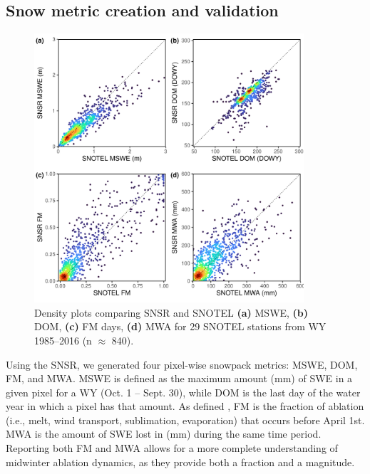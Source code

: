 
\hypertarget{ch2-methods-1}{\subsection{Snow metric creation and validation}\label{ch2-methods-1}}

\begin{figure}[t]
\centering
\includegraphics[width=10cm]{figures/ch2_figs/snsr_snotel_metric_compare_new_v1.pdf}
\caption{Density plots comparing SNSR and SNOTEL \textbf{(a)} MSWE, \textbf{(b)} DOM, \textbf{(c)} FM days, \textbf{(d)} MWA for 29 SNOTEL stations from WY 1985--2016 (n $\approx$ 840).}
\label{kuy_study_area}
\end{figure}

Using the SNSR, we generated four pixel-wise snowpack metrics: MSWE, DOM, FM, and MWA. MSWE is defined as the maximum amount (mm) of SWE in a given pixel for a WY (Oct. 1 -- Sept. 30), while DOM is the last day of the water year in which a pixel has that amount. As defined \cite{musselmanWinterMeltTrends2021}, FM is the fraction of ablation (i.e., melt, wind transport, sublimation, evaporation) that occurs before April 1st. MWA is the amount of SWE lost in (mm) during the same time period. Reporting both FM and MWA allows for a more complete understanding of midwinter ablation dynamics, as they provide both a fraction and a magnitude.


